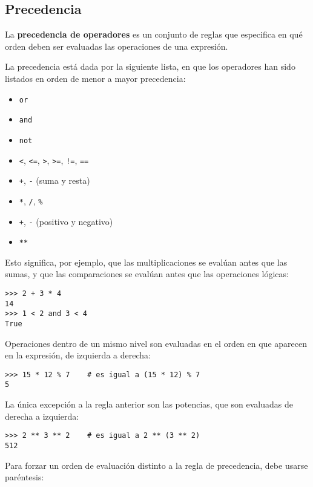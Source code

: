 \subsection{Precedencia}

La \textbf{precedencia de operadores} es un conjunto de reglas que
especifica en qué orden deben ser evaluadas las operaciones de una
expresión.

La precedencia está dada por la siguiente lista, en que los operadores
han sido listados en orden de menor a mayor precedencia:

\begin{itemize}
\item
  \lstinline!or!
\item
  \lstinline!and!
\item
  \lstinline!not!
\item
  \lstinline!<!, \lstinline!<=!, \lstinline!>!, \lstinline!>=!,
  \lstinline"!=", \lstinline!==!
\item
  \lstinline!+!, \lstinline!-! (suma y resta)
\item
  \lstinline!*!, \lstinline!/!, \lstinline!%!
\item
  \lstinline!+!, \lstinline!-! (positivo y negativo)
\item
  \lstinline!**!
\end{itemize}

Esto significa, por ejemplo, que las multiplicaciones se evalúan antes
que las sumas, y que las comparaciones se evalúan antes que las
operaciones lógicas:

\begin{lstlisting}
>>> 2 + 3 * 4
14
>>> 1 < 2 and 3 < 4
True
\end{lstlisting}

Operaciones dentro de un mismo nivel son evaluadas en el orden en que
aparecen en la expresión, de izquierda a derecha:

\begin{lstlisting}
>>> 15 * 12 % 7    # es igual a (15 * 12) % 7
5
\end{lstlisting}

La única excepción a la regla anterior son las potencias, que son
evaluadas de derecha a izquierda:

\begin{lstlisting}
>>> 2 ** 3 ** 2    # es igual a 2 ** (3 ** 2)
512
\end{lstlisting}

Para forzar un orden de evaluación distinto a la regla de precedencia,
debe usarse paréntesis:

